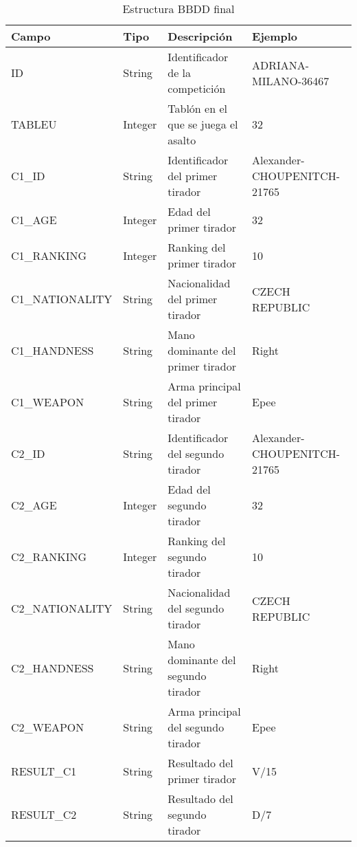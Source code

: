 \begin{longtable}{|p{3cm}p{2cm}p{6cm}p{3cm}|}
  \caption{Estructura \acs{BBDD} final}
  \label{tab:estructura BBDD final}
  \endfirsthead
  \endhead

  \hline
  \rowcolor[HTML]{C0C0C0}
  Campo & Tipo & Descripción & Ejemplo \\ \hline
  ID & String & Identificador de la competición & ADRIANA-MILANO-36467 \\ \hline
  TABLEU & Integer & Tablón en el que se juega el asalto & 32 \\ \hline

  \rowcolor[HTML]{969696}
  C1\_ID & String & Identificador del primer tirador & Alexander-CHOUPENITCH-21765 \\ \hline
  \rowcolor[HTML]{969696}
  C1\_AGE & Integer & Edad del primer tirador & 32 \\ \hline
  \rowcolor[HTML]{969696}
  C1\_RANKING & Integer & Ranking del primer tirador & 10 \\ \hline
  \rowcolor[HTML]{969696}
  C1\_NATIONALITY & String & Nacionalidad del primer tirador & CZECH REPUBLIC \\ \hline
  \rowcolor[HTML]{969696}
  C1\_HANDNESS & String & Mano dominante del primer tirador & Right \\ \hline
  \rowcolor[HTML]{969696}
  C1\_WEAPON & String & Arma principal del primer tirador & Epee \\ \hline

  \rowcolor[HTML]{e3e3e3}
  C2\_ID & String & Identificador del segundo tirador & Alexander-CHOUPENITCH-21765 \\ \hline
  \rowcolor[HTML]{e3e3e3}
  C2\_AGE & Integer & Edad del segundo tirador & 32 \\ \hline
  \rowcolor[HTML]{e3e3e3}
  C2\_RANKING & Integer & Ranking del segundo tirador & 10 \\ \hline
  \rowcolor[HTML]{e3e3e3}
  C2\_NATIONALITY & String & Nacionalidad del segundo tirador & CZECH REPUBLIC \\ \hline
  \rowcolor[HTML]{e3e3e3}
  C2\_HANDNESS & String & Mano dominante del segundo tirador & Right \\ \hline
  \rowcolor[HTML]{e3e3e3}
  C2\_WEAPON & String & Arma principal del segundo tirador & Epee \\ \hline

  \rowcolor[HTML]{969696}
  RESULT\_C1 & String & Resultado del primer tirador & V/15 \\ \hline
  \rowcolor[HTML]{e3e3e3}
  RESULT\_C2 & String & Resultado del segundo tirador & D/7 \\ \hline
\end{longtable}

